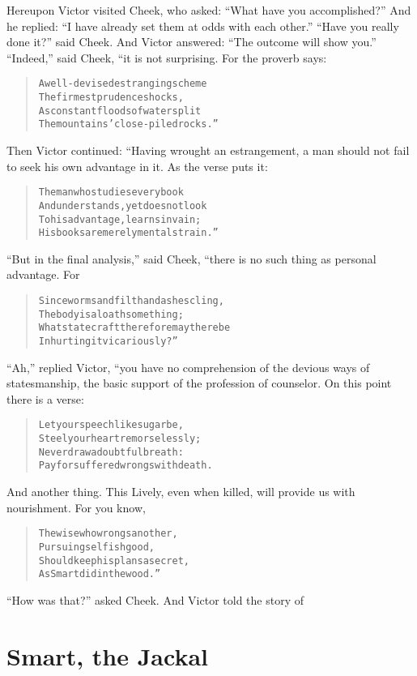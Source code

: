 \documentclass[article, twoside, 14pt]{memoir}
\renewenvironment{verbatim}{%
\begin{quote}%
\vskip -10pt%
\begin{alltt}\normalfont\large}{\end{alltt}%
\end{quote}%
\vskip -10pt
} %
\begin{document}
Hereupon Victor visited Cheek, who asked:
``What have you accomplished?'' And he replied:
``I have already set them at odds with each other.''
``Have you really done it?'' said Cheek. And Victor answered:
``The outcome will show you.'' ``Indeed,'' said Cheek, “it is not
surprising. For the proverb says:

\begin{verbatim}
A well-devised estranging scheme
    The firmest prudence shocks,
As constant floods of water split
    The mountains' close-piled rocks.”
\end{verbatim}
Then Victor continued: “Having wrought an estrangement, a man
should not fail to seek his own advantage in it. As the verse puts
it:

\begin{verbatim}
The man who studies every book
And understands, yet does not look
To his advantage, learns in vain;
His books are merely mental strain.”
\end{verbatim}
``But in the final analysis,'' said Cheek, “there is no such thing
as personal advantage. For

\begin{verbatim}
Since worms and filth and ashes cling,
The body is a loathsome thing;
What statecraft therefore may there be
In hurting it vicariously?”
\end{verbatim}
``Ah,'' replied Victor, “you have no comprehension of the devious
ways of statesmanship, the basic support of the profession of
counselor. On this point there is a verse:

\begin{verbatim}
Let your speech like sugar be,
Steel your heart remorselessly;
Never draw a doubtful breath:
Pay for suffered wrongs with death.
\end{verbatim}
And another thing. This Lively, even when killed, will provide us
with nourishment. For you know,

\begin{verbatim}
The wise who wrongs another,
    Pursuing selfish good,
Should keep his plans a secret,
    As Smart did in the wood.”
\end{verbatim}
``How was that?'' asked Cheek. And Victor told the story of

\chapter{Smart, the Jackal}

\label{s24}
\end{document}
